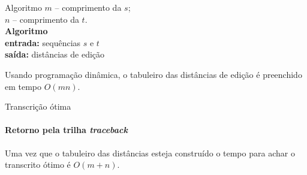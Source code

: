 \begin{frame}[fragile]{Algoritmo}
\small
$m$ -- comprimento da  $s$;\\
$n$ -- comprimento da  $t$.\\
{\bf Algoritmo}\\
{\bf entrada: }sequências $s$ e $t$\\
{\bf saída: }distâncias de edição
  \begin{algorithmic}
    \ENDFOR
    \ENDFOR
  \end{algorithmic}

  \begin{theorem}
    Usando programação dinâmica, o tabuleiro das distâncias de edição
    é preenchido em tempo $O(mn)$.
  \end{theorem}
  
\end{frame}

\begin{frame}{Transcrição ótima}
\framesubtitle{Retorno pela trilha {\it traceback\/}}

\begin{teorema}
Uma vez que o tabuleiro das distâncias esteja construído o tempo para
achar o transcrito ótimo é $O(m+n)$.
\end{teorema}

\end{frame}

